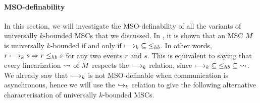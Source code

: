 


\paragraph*{MSO-definability}

In this section, we will investigate the MSO-definability of all the variants of universally $k$-bounded MSCs that we discussed.
In \cite{DBLP:conf/fossacs/LohreyM02}, it is shown that an MSC $M$ is universally $k$-bounded if and only if $\longmapsto_k \;\subseteq\; \leq_{hb}$. In other words, $r \longmapsto_k s \Rightarrow r \leq_{hb} s$ for any two events $r$ and $s$. This is equivalent to saying that every linearization $\rightsquigarrow$ of $M$ respects the $\longmapsto_k$ relation, since $\longmapsto_k \;\subseteq\; \leq_{hb} \;\subseteq\; \rightsquigarrow$. We already saw that $\longmapsto_k$ is not MSO-definable when communication is asynchronous, hence we will use the $\hookrightarrow_{k}$ relation to give the following alternative characterisation of universally $k$-bounded MSCs.

